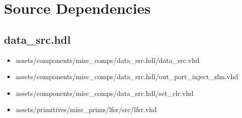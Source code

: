 \documentclass{article}
\def\comp{data\_src}
\begin{document}
\section*{Source Dependencies}
\subsection*{\comp.hdl}
\begin{itemize}
  \item assets/components/misc\_comps/\comp.hdl/\comp.vhd
  \item assets/components/misc\_comps/\comp.hdl/out\_port\_inject\_zlm.vhd
  \item assets/components/misc\_comps/\comp.hdl/set\_clr.vhd
  \item assets/primitives/misc\_prims/lfsr/src/lfsr.vhd
\end{itemize}
\end{document}
